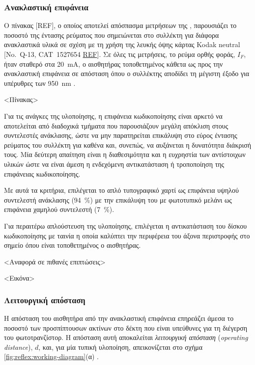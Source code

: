 \subsubsection{Ανακλαστική επιφάνεια}

Ο πίνακας [REF], ο οποίος αποτελεί απόσπασμα μετρήσεων της \textcite{vishay06},
παρουσιάζει το ποσοστό της έντασης ρεύματος που σημειώνεται στο συλλέκτη για
διάφορα ανακλαστικά υλικά σε σχέση με τη χρήση της λευκής όψης κάρτας Kodak
neutral [No.~Q-13, CAT~1527654 \underline{REF}]. Σε όλες τις μετρήσεις, το ρεύμα
ορθής φοράς, $I_{F}$, ήταν σταθερό στα 20~mA, ο αισθητήρας τοποθετημένος κάθετα
ως προς την ανακλαστική επιφάνεια σε απόσταση όπου ο συλλέκτης αποδίδει τη
μέγιστη έξοδο για υπέρυθρες των 950~nm \textcite{vishay06}.

<Πίνακας>

Για τις ανάγκες της υλοποίησης, η επιφάνεια κωδικοποίησης είναι αρκετό να
αποτελείται από διαδοχικά τμήματα που παρουσιάζουν μεγάλη απόκλιση στους
συντελεστές ανάκλασης, ώστε να μην παρατηρείται επικάλυψη στο εύρος έντασης
ρεύματος του συλλέκτη για καθένα και, συνεπώς, να αυξάνεται η δυνατότητα
διάκρισή τους. Μία δεύτερη απαίτηση είναι η διαθεσιμότητα και η ευχρηστία των
αντίστοιχων υλικών ώστε να είναι άμεση η ενδεχόμενη αντικατάσταση ή τροποποίηση
της επιφάνειας κωδικοποίησης.

Με αυτά τα κριτήρια, επιλέγεται το απλό τυπογραφικό χαρτί ως επιφάνεια υψηλού
συντελεστή ανάκλασης (94~\%) με την επικάλυψη του με φωτοτυπικό μελάνι ως
επιφάνεια χαμηλού συντελεστή (7~\%).

Για περαιτέρω απλούστευση της υλοποίησης, επιλέγεται η αντικατάσταση του δίσκου
κωδικοποίησης με ταινία η οποία καλύπτει την περιφέρεια του άξονα περιστροφής
στο σημείο όπου είναι τοποθετημένος ο αισθητήρας.

<Αναφορά σε πιθανές επιπτώσεις>

<Εικόνα>

\subsubsection{Λειτουργική απόσταση}

Η απόσταση του αισθητήρα από την ανακλαστική επιφάνεια επηρεάζει άμεσα το
ποσοστό των προσπίπτουσων ακτίνων στο δέκτη που είναι υπεύθυνες για τη διέγερση
του φωτοτρανζίστορ. Η απόσταση αυτή αποκαλείται \emph{λειτουργική απόσταση}
 (\emph{operating distance}), $d$, και, για μία
τυπική υλοποίηση, απεικονίζεται στο σχήμα \ref{fig:reflex:working-diagram}(α)
\parencite{vishay02}.


